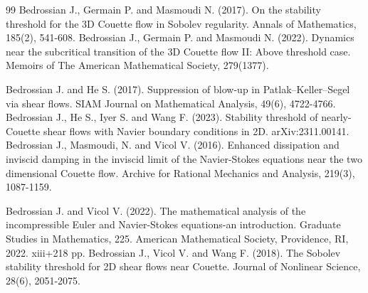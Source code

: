 \documentclass[12pt, reqno]{amsart}
\numberwithin{equation}{section}
\begin{document}
	\begin{thebibliography}{99}	%
		Bedrossian J., Germain P. and Masmoudi N. (2017). On the stability threshold for the 3D Couette flow in Sobolev regularity. Annals of Mathematics, 185(2), 541-608.
		 Bedrossian J., Germain P. and Masmoudi N. (2022). Dynamics near the subcritical transition of the 3D Couette flow II: Above threshold case. Memoirs of The American Mathematical Society, 279(1377).


		Bedrossian J. and He S. (2017). Suppression of blow-up in Patlak--Keller--Segel via shear flows.
		SIAM Journal on Mathematical Analysis, 49(6), 4722-4766.
		 Bedrossian J., He S., Iyer S. and Wang F. (2023). Stability threshold of nearly-Couette shear flows with Navier boundary conditions in 2D. arXiv:2311.00141.
		 Bedrossian J., Masmoudi, N. and Vicol V. (2016). Enhanced dissipation and inviscid damping in the inviscid limit of the Navier-Stokes equations near the two dimensional Couette flow. Archive for Rational Mechanics and Analysis, 219(3), 1087-1159.

 Bedrossian J. and Vicol V. (2022). The mathematical analysis of the incompressible Euler and Navier-Stokes equations-an introduction. Graduate Studies in Mathematics, 225. American Mathematical Society, Providence, RI, 2022. xiii+218 pp.
		 Bedrossian J., Vicol V. and Wang F. (2018). The Sobolev stability threshold for 2D shear flows near Couette. Journal of Nonlinear Science, 28(6), 2051-2075.
		

\end{thebibliography}
\end{document}
